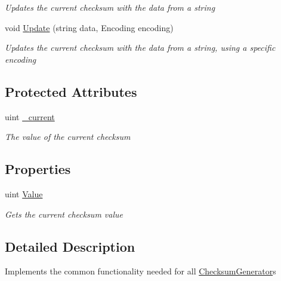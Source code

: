 \begin{DoxyCompactItemize}
\begin{DoxyCompactList}\small\item\em Updates the current checksum with the data from a string \end{DoxyCompactList}\item 
void \hyperlink{class_dot_z_lib_1_1_checksum_generator_base_ad8e1adfbbfcc12ab74c772f3292bfee3}{Update} (string data, Encoding encoding)
\begin{DoxyCompactList}\small\item\em Updates the current checksum with the data from a string, using a specific encoding \end{DoxyCompactList}\end{DoxyCompactItemize}
\subsection*{Protected Attributes}
\begin{DoxyCompactItemize}
\item 
uint \hyperlink{class_dot_z_lib_1_1_checksum_generator_base_a081221e827dc7d3050fbdffc2973abea}{\+\_\+current}
\begin{DoxyCompactList}\small\item\em The value of the current checksum \end{DoxyCompactList}\end{DoxyCompactItemize}
\subsection*{Properties}
\begin{DoxyCompactItemize}
\item 
uint \hyperlink{class_dot_z_lib_1_1_checksum_generator_base_aeaf336483beafb0c2af9285bf37db5fe}{Value}
\begin{DoxyCompactList}\small\item\em Gets the current checksum value \end{DoxyCompactList}\end{DoxyCompactItemize}


\subsection{Detailed Description}
Implements the common functionality needed for all \hyperlink{interface_dot_z_lib_1_1_checksum_generator}{Checksum\+Generator}s 



